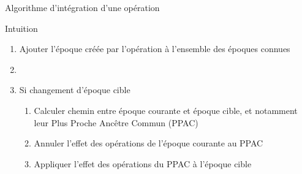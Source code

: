 \begin{frame}{Algorithme d'intégration d'une opération \ren}
  \begin{block}{Intuition}
    \begin{enumerate}
      \item<2-> Ajouter l'époque créée par l'opération \ren à l'ensemble des époques connues
      \item<3->
      \item<4-> Si changement d'époque cible
      \begin{enumerate}
        \item<5-> Calculer chemin entre époque courante et époque cible, et notamment leur Plus Proche Ancêtre Commun (PPAC)
        \item<6-> Annuler l'effet des opérations \ren de l'époque courante au PPAC
        \item<7-> Appliquer l'effet des opérations \ren du PPAC à l'époque cible
      \end{enumerate}
    \end{enumerate}
  \end{block}
\end{frame}

